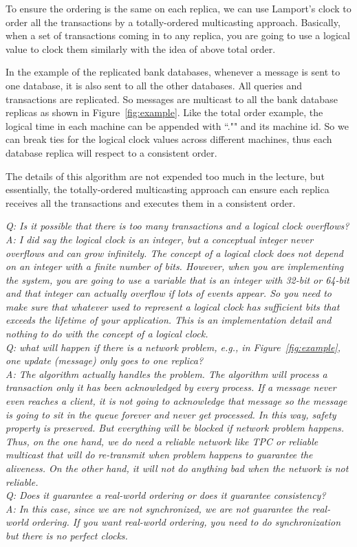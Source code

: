 \documentclass[twoside]{article}
\begin{document}
To ensure the ordering is the same on each replica, we can use Lamport's clock to order all the transactions by a totally-ordered multicasting approach. Basically, when a set of transactions coming in to any replica, you are going to use a logical value to clock them similarly with the idea of above total order. 

In the example of the replicated bank databases, whenever a message is sent to one database, it is also sent to all the other databases. All queries and transactions are replicated. So messages are multicast to all the bank database replicas as shown in Figure~\ref{fig:example}. Like the total order example, the logical time in each machine can be appended with ``."" and its machine id. So we can break ties for the logical clock values across different machines, thus each database replica will respect to a consistent order.

The details of this algorithm are not expended too much in the lecture, but essentially, the totally-ordered multicasting approach can ensure each replica receives all the transactions and executes them in a consistent order.

\textit{Q: Is it possible that there is too many transactions and a logical clock overflows?\\
A: I did say the logical clock is an integer, but a conceptual integer never overflows and can grow infinitely. The concept of a logical clock does not depend on an integer with a finite number of bits. However, when you are implementing the system, you are going to use a variable that is an integer with 32-bit or 64-bit and that integer can actually overflow if lots of events appear. So you need to make sure that whatever used to represent a logical clock has sufficient bits that exceeds the lifetime of your application. This is an implementation detail and nothing to do with the concept of a logical clock.\\
Q: what will happen if there is a network problem, e.g., in Figure~\ref{fig:example}, one update (message) only goes to one replica?\\
A: The algorithm actually handles the problem. The algorithm will process a transaction only it has been acknowledged by every process. If a message never even reaches a client, it is not going to acknowledge that message so the message is going to sit in the queue forever and never get processed. In this way, safety property is preserved. But everything will be blocked if network problem happens. 
Thus, on the one hand, we do need a reliable network like TPC or reliable multicast that will do re-transmit when problem happens to guarantee the  aliveness. On the other hand, it will not do anything bad when the network is not reliable.\\
Q: Does it guarantee a real-world ordering or does it guarantee consistency?\\
A: In this case, since we are not synchronized, we are not guarantee the real-world ordering. If you want real-world ordering, you need to do synchronization but there is no perfect clocks.}
\end{document}
